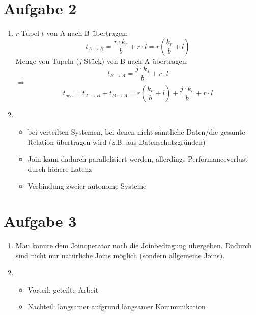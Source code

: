 \documentclass[a4paper]{article}
\begin{document}
\section*{Aufgabe 2}
\begin{enumerate}[label=\alph*)]
\item $r$ Tupel $t$ von A nach B übertragen: 
\[t_{A\rightarrow B} = \frac{r\cdot k_r}{b}+r\cdot l = r\left(\frac{k_r}{b} + l \right)\]
Menge von Tupeln ($j$ Stück) von B nach A übertragen:
\[t_{B\rightarrow A} = \frac{j\cdot k_s}{b}+r\cdot l\]
$\Rightarrow$ \[t_{ges} = t_{A\rightarrow B} + t_{B\rightarrow A} =  r\left(\frac{k_r}{b} + l \right) + \frac{j\cdot k_s}{b}+r\cdot l\]

\item \begin{itemize}
\item  bei verteilten Systemen, bei denen nicht sämtliche Daten/die gesamte Relation übertragen wird (z.B. aus Datenschutzgründen)
\item Join kann dadurch parallelisiert werden, allerdings Performanceverlust durch höhere Latenz
\item Verbindung zweier autonome Systeme
\end{itemize}
\end{enumerate}

\section*{Aufgabe 3}
\begin{enumerate}[label=\alph*)]

\item Man könnte dem Joinoperator noch die Joinbedingung übergeben. Dadurch sind nicht nur natürliche Joins möglich (sondern allgemeine Joins).
\item \begin{itemize}
\item Vorteil: geteilte Arbeit
\item  Nachteil: langsamer aufgrund langsamer Kommunikation
\end{itemize}
\end{enumerate}
\end{document}
